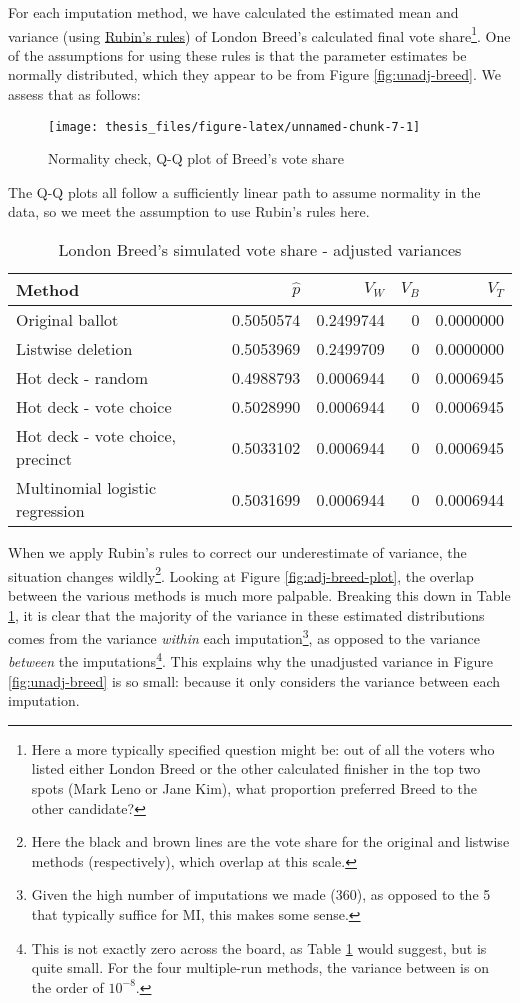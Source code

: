 \documentclass[12pt,twoside]{reedthesis}
\begin{document}
For each imputation method, we have calculated the estimated mean and variance (using \protect\hyperlink{rubins-rules}{Rubin's rules}) of London Breed's calculated final vote share\footnote{Here a more typically specified question might be: out of all the voters who listed either London Breed or the other calculated finisher in the top two spots (Mark Leno or Jane Kim), what proportion preferred Breed to the other candidate?}. One of the assumptions for using these rules is that the parameter estimates be normally distributed, which they appear to be from Figure \ref{fig:unadj-breed}. We assess that as follows:
\begin{figure}
\texttt{[image: thesis\_files/figure-latex/unnamed-chunk-7-1]} \caption{Normality check, Q-Q plot of Breed's vote share}\label{fig:unnamed-chunk-7}
\end{figure}
The Q-Q plots all follow a sufficiently linear path to assume normality in the data, so we meet the assumption to use Rubin's rules here.
\begin{table}[t]

\caption{\label{tab:adj-breed-tab}London Breed's simulated vote share - adjusted variances}
\centering
\begin{tabular}{lrrrr}
\toprule
Method & $\hat{p}$ & $V_W$ & $V_B$ & $V_T$\\
\midrule
Original ballot & 0.5050574 & 0.2499744 & 0 & 0.0000000\\
Listwise deletion & 0.5053969 & 0.2499709 & 0 & 0.0000000\\
Hot deck - random & 0.4988793 & 0.0006944 & 0 & 0.0006945\\
Hot deck - vote choice & 0.5028990 & 0.0006944 & 0 & 0.0006945\\
Hot deck - vote choice, precinct & 0.5033102 & 0.0006944 & 0 & 0.0006945\\
\addlinespace
Multinomial logistic regression & 0.5031699 & 0.0006944 & 0 & 0.0006944\\
\bottomrule
\end{tabular}
\end{table}
When we apply Rubin's rules to correct our underestimate of variance, the situation changes wildly\footnote{Here the black and brown lines are the vote share for the original and listwise methods (respectively), which overlap at this scale.}. Looking at Figure \ref{fig:adj-breed-plot}, the overlap between the various methods is much more palpable. Breaking this down in Table \ref{tab:adj-breed-tab}, it is clear that the majority of the variance in these estimated distributions comes from the variance \emph{within} each imputation\footnote{Given the high number of imputations we made (360), as opposed to the 5 that typically suffice for MI, this makes some sense.}, as opposed to the variance \emph{between} the imputations\footnote{This is not exactly zero across the board, as Table \ref{tab:adj-breed-tab} would suggest, but is quite small. For the four multiple-run methods, the variance between is on the order of \(10^{-8}\).}. This explains why the unadjusted variance in Figure \ref{fig:unadj-breed} is so small: because it only considers the variance between each imputation.
\end{document}
